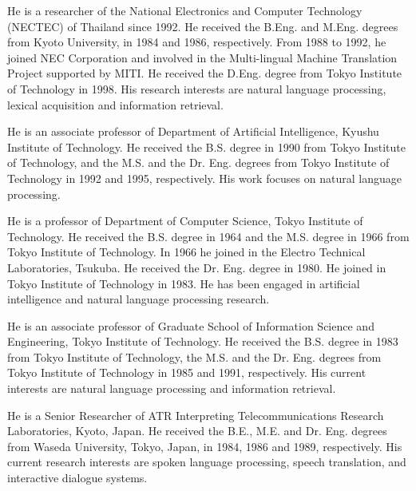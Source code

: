 \begin{biography}

\biotitle{}

{
  He is a researcher of the National Electronics and Computer
  Technology (NECTEC) of Thailand since 1992. He received the B.Eng. and
  M.Eng. degrees from Kyoto University, in 1984 and 1986,
  respectively. From 1988 to 1992, he joined NEC Corporation and
  involved in the Multi-lingual Machine Translation Project
  supported by MITI. He received the D.Eng. degree from Tokyo
  Institute of Technology in 1998. His research interests are
  natural language processing, lexical acquisition and information 
  retrieval.
}

{
  He is an associate professor of Department of Artificial Intelligence,
  Kyushu Institute of Technology. He received the B.S. degree in 1990
  from Tokyo Institute of Technology, and the M.S. and the
  Dr. Eng. degrees from Tokyo Institute of Technology in 1992 and 1995,
  respectively. His work focuses on natural language processing.
}

{
  He is a professor of Department of Computer Science, Tokyo Institute
  of Technology. He received the B.S. degree in 1964 and the M.S. degree
  in 1966 from Tokyo Institute of Technology. In 1966 he joined in the
  Electro Technical Laboratories, Tsukuba. He received the
  Dr. Eng. degree in 1980. He joined in Tokyo Institute of Technology in
  1983. He has been engaged in artificial intelligence and natural
  language processing research.
}

{
  He is an associate professor of Graduate School of Information Science
  and Engineering, Tokyo Institute of Technology. He received the B.S.
  degree in 1983 from Tokyo Institute of Technology, the M.S. and the
  Dr. Eng. degrees from Tokyo Institute of Technology in 1985 and 1991,
  respectively. His current interests are natural language processing
  and information retrieval.
}

{
  He is a Senior Researcher of ATR Interpreting Telecommunications
  Research Laboratories, Kyoto, Japan.  He received the B.E., M.E. and 
  Dr. Eng. degrees from Waseda University, Tokyo, Japan, in 1984, 1986
  and 1989, respectively.  His current research interests are spoken
  language processing, speech translation, and interactive dialogue
  systems.
}


\end{biography}



